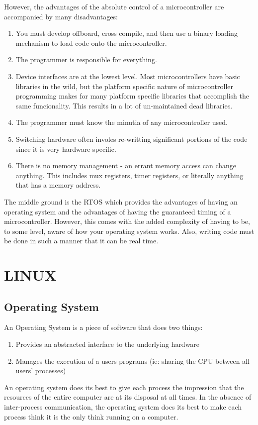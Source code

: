 \documentclass{article}
\begin{document}
However, the advantages of the absolute control of a microcontroller are accompanied by many disadvantages:
\begin{enumerate}
    \item You must develop offboard, cross compile, and then use a binary loading mechanism to load code onto the microcontroller.
    \item The programmer is responsible for everything.
    \item Device interfaces are at the lowest level.  Most microcontrollers have basic libraries in the wild, but the platform specific nature of microcontroller programming makes for many platform specific libraries that accomplish the same funcionality.  This results in a lot of un-maintained dead libraries.
    \item The programmer must know the minutia of any microcontroller used.
    \item Switching hardware often involes re-writting significant portions of the code since it is very hardware specific.
    \item There is no memory management - an errant memory access can change anything.  This includes mux registers, timer registers, or literally anything that has a memory address.
\end{enumerate}

The middle ground is the RTOS which provides the advantages of having an operating system and the advantages of having the guaranteed timing of a microcontroller.  However, this comes with the added complexity of having to be, to some level, aware of how your operating system works.  Also, writing code must be done in such a manner that it can be real time.

\section{LINUX}
\subsection{Operating System}
An Operating System is a piece of software that does two things:
\begin{enumerate}
    \item Provides an abstracted interface to the underlying hardware
    \item Manages the execution of a users programs (ie: sharing the CPU between all users' processes)
\end{enumerate}
An operating system does its best to give each process the impression that the resources of the entire computer are at its disposal at all times.  In the absence of inter-process communication, the operating system does its best to make each process think it is the only think running on a computer.
\end{document}
